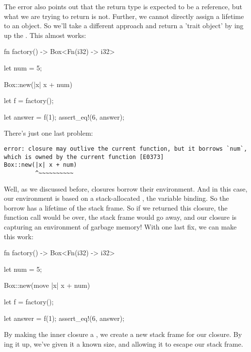 \blank

The error also points out that the return type is expected to be a reference, but what we are trying to return is not. Further, we 
cannot directly assign a  lifetime to an object. So we'll take a different approach and return a 'trait object' by 
ing up the . This almost works:

\begin{rustc}
fn factory() -> Box<Fn(i32) -> i32> {
    let num = 5;

    Box::new(|x| x + num)
}
let f = factory();

let answer = f(1);
assert_eq!(6, answer);
\end{rustc}

There's just one last problem:

\begin{verbatim}
error: closure may outlive the current function, but it borrows `num`,
which is owned by the current function [E0373]
Box::new(|x| x + num)
         ^~~~~~~~~~~
\end{verbatim}

Well, as we discussed before, closures borrow their environment. And in this case, our environment is based on a stack-allocated , 
the  variable binding. So the borrow has a lifetime of the stack frame. So if we returned this closure, the function call 
would be over, the stack frame would go away, and our closure is capturing an environment of garbage memory! With one last fix, we can 
make this work:

\begin{rustc}
fn factory() -> Box<Fn(i32) -> i32> {
    let num = 5;

    Box::new(move |x| x + num)
}
let f = factory();

let answer = f(1);
assert_eq!(6, answer);
\end{rustc}

By making the inner closure a , we create a new stack frame for our closure. By ing it up, we've given it a known 
size, and allowing it to escape our stack frame.
